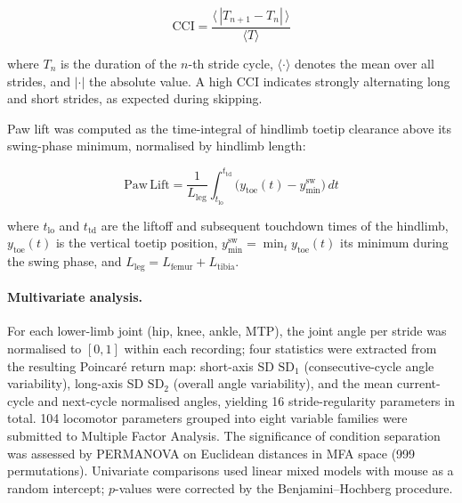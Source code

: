 \documentclass[blue]{enslyonstage}
\begin{document}
\begin{equation}
    \text{CCI} = \frac{\langle\, |T_{n+1} - T_n| \,\rangle}{\langle T \rangle}
    \label{eq:cci}
\end{equation}

\noindent where $T_n$ is the duration of the $n$-th stride cycle,
$\langle \cdot \rangle$ denotes the mean over all strides, and $|\cdot|$ the
absolute value. A high CCI indicates strongly alternating long and short
strides, as expected during skipping.

Paw lift was computed as the time-integral of hindlimb toetip clearance above
its swing-phase minimum, normalised by hindlimb length:

\begin{equation}
    \mathrm{Paw\, Lift} = \frac{1}{L_\text{leg}}
    \int_{t_\text{lo}}^{t_\text{td}}
    \bigl(y_\text{toe}(t) - y_\text{min}^\text{sw}\bigr)\, dt
    \label{eq:pl}
\end{equation}

\noindent where $t_\text{lo}$ and $t_\text{td}$ are the liftoff and subsequent
touchdown times of the hindlimb, $y_\text{toe}(t)$ is the vertical toetip
position, $y_\text{min}^\text{sw} = \min_t y_\text{toe}(t)$ its minimum during
the swing phase, and $L_\text{leg} = L_\text{femur} + L_\text{tibia}$.

\paragraph{Multivariate analysis.}
For each lower-limb joint (hip, knee, ankle, MTP), the joint angle per stride
was normalised to $[0, 1]$ within each recording; four statistics were
extracted from the resulting Poincaré return map: short-axis SD
$\mathrm{SD}_1$ (consecutive-cycle angle variability), long-axis SD
$\mathrm{SD}_2$ (overall angle variability), and the mean current-cycle and
next-cycle normalised angles, yielding 16 stride-regularity parameters in
total\cite{brennanExistingMeasuresPoincare2001}.
104 locomotor parameters grouped into eight variable families were submitted to
Multiple Factor Analysis\cite{escofierMultipleFactorAnalysis1994,leFactoMineRPackageMultivariate2008}.
The significance of condition separation was assessed by
PERMANOVA\cite{andersonNewMethodNonparametric2001,oksanenVeganCommunityEcology2001}
on Euclidean distances in MFA space (999 permutations). Univariate comparisons
used linear mixed models with mouse as a random intercept; $p$-values were
corrected by the Benjamini–Hochberg procedure.
\end{document}
